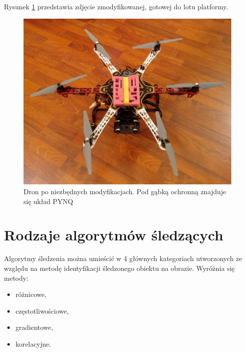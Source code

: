 Rysunek \ref{fig:drone_photo} przedstawia zdjęcie zmodyfikowanej, gotowej do lotu platformy.
\begin{figure}[h]
	\centering
	\captionsetup{justification=centering,margin=1cm}
	\hspace*{0cm}
	\includegraphics[width=14cm]{5_drone_photo.jpg}
	\caption{Dron po niezbędnych modyfikacjach. Pod gąbką ochronną znajduje się układ PYNQ}
	\label{fig:drone_photo}
\end{figure}




\section{Rodzaje algorytmów śledzących}
\label{sec:algorytmySledzace}

Algorytmy śledzenia można umieścić w 4 głównych kategoriach utworzonych ze względu na metodę identyfikacji śledzonego obiektu na obrazie. 
Wyróżnia się metody:
\begin{itemize}
	\item różnicowe,
	\item częstotliwościowe,
	\item gradientowe,
	\item korelacyjne.
\end{itemize}

